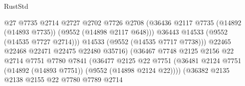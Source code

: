 \begin{lexlean}{RustStd}
\begin{coremodule}
                                              @27
                                              @7735
                                              @2714
                                              @2727
                                              @2702
                                              @7726
                                              @2708
                                              (@36436
                                                @2117
                                                @7735
                                                (@14892 (@14893 @7735))
                                                (@9552 (@14898 @2117 @648)))
                                              @36443
                                              @14533
                                              (@9552 (@14535 @7727 @2714)))
                                            @14533
                                            (@9552 (@14535 @7717 @7738)))
                                          @22465
                                          @22468
                                          @22471
                                          @22475
                                          @22480
                                          @35716)
                                        (@36467
                                          @7748
                                          @2125
                                          @2156
                                          @22
                                          @2714
                                          @7751
                                          @7780
                                          @7841
                                          (@36477
                                            @2125
                                            @22
                                            @7751
                                            (@36481
                                              @2124
                                              @7751
                                              (@14892 (@14893 @7751))
                                              (@9552 (@14898 @2124 @22))))
                                          (@36382
                                            @2135
                                            @2138
                                            @2155
                                            @22
                                            @7780
                                            @7789
                                            @2714

\end{coremodule}
\end{lexlean}
